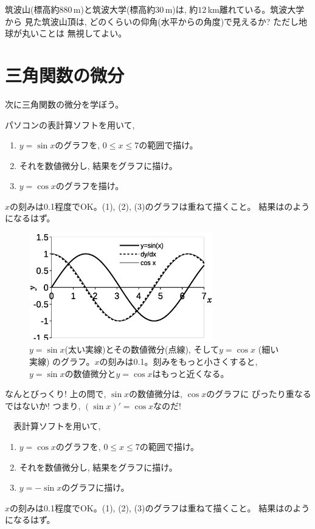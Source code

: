 \begin{q}\label{q:trig_arcsin2} 
筑波山(標高約$880\,$m)と筑波大学(標高約$30\,$m)は, 約$12\,$km離れている。筑波大学から
見た筑波山頂は, どのくらいの仰角(水平からの角度)で見えるか? ただし地球が丸いことは
無視してよい。\end{q}
\mv


\section{三角関数の微分}

次に三角関数の微分を学ぼう。

\begin{q}\label{q:trig_numericdiff_sin} パソコンの表計算ソフトを用いて, 
\begin{enumerate}
\item $y=\sin x$のグラフを, $0\leq x \leq 7$の範囲で描け。
\item それを数値微分し, 結果をグラフに描け。
\item $y=\cos x$のグラフを描け。
\end{enumerate}
$x$の刻みは0.1程度でOK。(1), (2), (3)のグラフは重ねて描くこと。
結果はのようになるはず。
\end{q}

\begin{figure}[h]
    \centering
    \includegraphics[width=8cm]{diffsin.eps}
    \caption{$y=\sin x$(太い実線)とその数値微分(点線), そして$y=\cos x$ (細い実線)
のグラフ。$x$の刻みは0.1。刻みをもっと小さくすると, 
$y=\sin x$の数値微分と$y=\cos x$はもっと近くなる。}\label{fig:diffsin}
\end{figure}

なんとびっくり! 上の問で, $\sin x$の数値微分は, $\cos x$のグラフに
ぴったり重なるではないか! つまり, $(\sin x)'=\cos x$なのだ!

\begin{q}\label{q:trig_numericdiff_cos}　表計算ソフトを用いて, 
\begin{enumerate}
\item $y=\cos x$のグラフを, $0\leq x \leq 7$の範囲で描け。
\item それを数値微分し, 結果をグラフに描け。
\item $y=-\sin x$のグラフに描け。
\end{enumerate}
$x$の刻みは0.1程度でOK。(1), (2), (3)のグラフは重ねて描くこと。
結果はのようになるはず。
\end{q}

